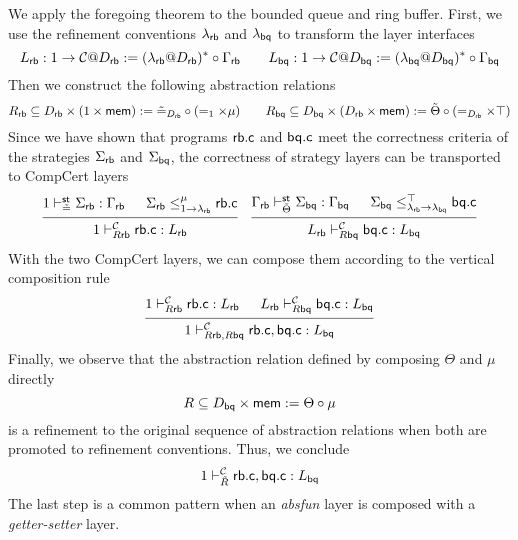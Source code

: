 \documentclass[acmsmall,review,anonymous]{acmart}\settopmatter{printfolios=true,printccs=false,printacmref=false}
\begin{document}
\begin{example}
  We apply the foregoing theorem
  to the bounded queue and ring buffer.
  First, we use the refinement conventions
  $\lambda_{ \mathsf{rb} }$ and $\lambda_{ \mathsf{bq} }$
  to transform the layer interfaces
  \[
    L_{ \mathsf{rb} }: 1 \rightarrow \mathcal{C}@D_{ \mathsf{rb} }
    := (\lambda_{ \mathsf{rb} } @D_{ \mathsf{rb} })^* \circ \Gamma_{ \mathsf{rb} }
    \qquad
    L_{ \mathsf{bq} }: 1 \rightarrow \mathcal{C}@D_{ \mathsf{bq} }
    := (\lambda_{ \mathsf{bq} } @D_{ \mathsf{bq} })^* \circ \Gamma_{ \mathsf{bq} }
  \]
  Then we construct the following abstraction relations
  \[
    R_{ \mathsf{rb} } \subseteq D_{ \mathsf{rb} } \times (1 \times  \mathsf{mem} )
    := \tilde{=}_{D_{ \mathsf{rb} }} \circ (=_1 \times \mu)
    \qquad
    R_{ \mathsf{bq} } \subseteq D_{ \mathsf{bq} } \times (D_{ \mathsf{rb} } \times  \mathsf{mem} )
    := \tilde{\Theta} \circ (=_{D_{ \mathsf{rb} }} \times \top)
  \]
  Since we have shown that
  programs $ \mathsf{rb.c} $ and $ \mathsf{bq.c} $
  meet the correctness criteria
  of the strategies $\Sigma_{ \mathsf{rb} }$ and $\Sigma_{ \mathsf{bq} }$,
  the correctness of strategy layers
  can be transported to CompCert layers
  \[
    \begin{prooftree}
      \hypo{1 \vdash^\kw{st}_{\tilde{=}} \Sigma_\kw{rb} : \Gamma_\kw{rb}}
      \hypo{\Sigma_\kw{rb} \le^\mu_{1 \rightarrow \lambda_\kw{rb}} \kw{rb.c}}
      \infer2{1 \vdash^\mathcal{C}_{R\kw{rb}} \kw{rb.c}: L_\kw{rb}}
    \end{prooftree}
    \quad
    \begin{prooftree}
      \hypo{\Gamma_\kw{rb} \vdash^\kw{st}_{\tilde{\Theta}} \Sigma_\kw{bq} : \Gamma_\kw{bq}}
      \hypo{\Sigma_\kw{bq} \le^\top_{\lambda_\kw{rb} \rightarrow \lambda_\kw{bq}} \kw{bq.c}}
      \infer2{L_\kw{rb} \vdash^\mathcal{C}_{R\kw{bq}} \kw{bq.c}: L_\kw{bq}}
    \end{prooftree}
  \]
  With the two CompCert layers,
  we can compose them according to
  the vertical composition rule
  \[
    \begin{prooftree}
      \hypo{1 \vdash^\mathcal{C}_{R\kw{rb}} \kw{rb.c}: L_\kw{rb}}
      \hypo{L_\kw{rb} \vdash^\mathcal{C}_{R\kw{bq}} \kw{bq.c}: L_\kw{bq}}
      \infer2{1 \vdash^\mathcal{C}_{R\kw{rb}, R\kw{bq}}
        \kw{rb.c}, \kw{bq.c}: L_\kw{bq}}
    \end{prooftree}
  \]
  Finally, we observe that
  the abstraction relation defined by
  composing $\Theta$ and $\mu$ directly
  \[
    R \subseteq D_{ \mathsf{bq} } \times  \mathsf{mem} 
    := \Theta \circ \mu
  \]
  is a refinement to
  the original sequence of abstraction relations
  when both are promoted to
  refinement conventions.
  Thus, we conclude
  \[
    1 \vdash^\mathcal{C}_{\tilde{R}}
         \mathsf{rb.c} ,  \mathsf{bq.c} : L_{ \mathsf{bq} }
  \]
  The last step is a common pattern
  when an \emph{absfun} layer
  is composed with a \emph{getter-setter} layer.
\end{example}
\end{document}

